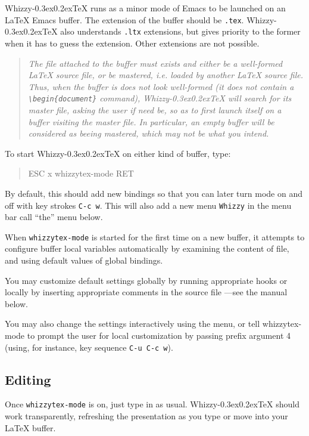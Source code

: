 \documentclass[12pt]{article}
\makeatletter
\let \lst \verb
\def \whizzy {{Whizzy\kern -0.3ex\raise 0.2ex\hbox{\let \@\relax\TeX}}}
\makeatother
\begin{document}
{\whizzy} runs as a minor mode of Emacs to be launched on 
an {\LaTeX} Emacs buffer. The extension of the buffer should be \lst".tex".
{\whizzy} also understands \lst".ltx" extensions, but gives priority to the
former when it has to guess the extension. Other extensions are not possible.
\begin{quote}\em
The file attached to the buffer must exists and either be a well-formed
{\LaTeX} source file, or be {\em mastered}, {\em i.e.} loaded by another
{\LaTeX} source file. Thus, when the buffer is does not look well-formed (it
does not contain a \lst"\begin{document}" command), {\whizzy} will search
for its master file, asking the user if need be, so as to first launch
itself on a buffer visiting the master file. In particular, an empty buffer
will be considered as beeing mastered, which may not be what you intend. 
\end{quote}
To start {\whizzy} on either kind of buffer, type:
\begin{quote}
\begin{tt}
ESC x whizzytex-mode RET
\end{tt}
\end{quote}
By default, this should add new bindings so that you can later turn mode
on and off with key strokes {\tt C-c w}. This will also add a new menu
{\tt Whizzy} in the menu bar call ``the'' menu below.

When {\tt whizzytex-mode} is started for the first time on a new buffer, it
attempts to configure buffer local variables automatically by examining
the content of file, and using default values of global bindings.

You may customize default settings globally by running appropriate
hooks or locally by inserting appropriate comments in the source file ---see
the manual below. 

You may also change the settings interactively using the menu, or tell
whizzytex-mode to prompt the user for local customization by passing prefix
argument 4 (using, for instance, key sequence \lst"C-u C-c w"). 


\subsection {Editing}

Once {\tt whizzytex-mode} is on, just type in as usual.  {\whizzy} should work
transparently, refreshing the presentation as you type or move into your
{\LaTeX} buffer. 
\end{document}
